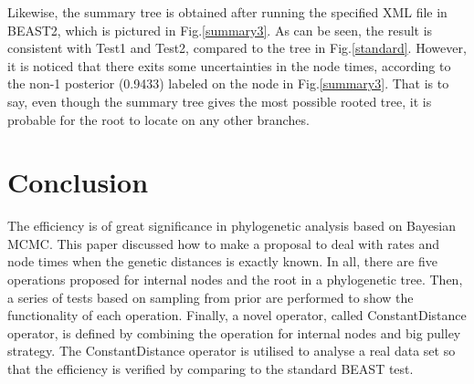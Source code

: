 \documentclass{bmcart}
\begin{document}
Likewise, the summary tree is obtained after running the specified XML file in BEAST2, which is pictured in Fig.\ref{summary3}. As can be seen, the result is consistent with Test1 and Test2, compared to the tree in Fig.\ref{standard}.  However, it is noticed that there exits some uncertainties in the node times, according to the non-1 posterior (0.9433) labeled on the node in Fig.\ref{summary3}. That is to say, even though the summary tree gives the most possible rooted tree, it is probable for the root to locate on any other branches. 

\section*{Conclusion}
The efficiency is of great significance in phylogenetic analysis based on Bayesian MCMC. This paper discussed how to make a proposal to deal with rates and node times when the genetic distances is exactly known. In all, there are five operations proposed for internal nodes and the root in a phylogenetic tree. Then, a series of tests based on sampling from prior are performed to show the functionality of each operation. Finally, a novel operator, called ConstantDistance operator, is defined by combining the operation for internal nodes and big pulley strategy. The ConstantDistance operator is utilised to analyse a real data set so that the efficiency is verified by comparing to the standard BEAST test. 
\end{document}
